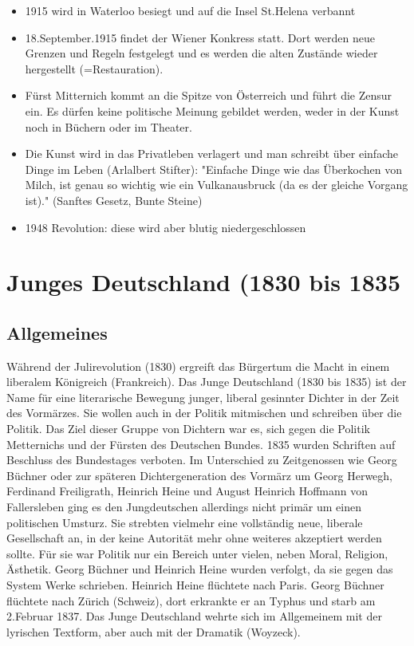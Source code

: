 \documentclass[12pt,a4paper]{article}
\begin{document}
	\begin{itemize}
	\item 1915 wird in Waterloo besiegt und auf die Insel St.Helena verbannt
	\item 18.September.1915 findet der Wiener Konkress statt. Dort werden neue Grenzen und Regeln festgelegt und es werden die alten Zustände
	wieder hergestellt (=Restauration).
	\item Fürst Mitternich kommt an die Spitze von Österreich und führt die Zensur ein. Es dürfen keine politische Meinung gebildet werden, weder in der Kunst noch in Büchern oder im Theater.
	\item Die Kunst wird in das Privatleben verlagert und man schreibt über einfache Dinge im Leben (Arlalbert Stifter): "Einfache Dinge wie das Überkochen von Milch, ist genau so wichtig wie ein Vulkanausbruck (da es der gleiche Vorgang ist)." (Sanftes Gesetz, Bunte Steine)

	\item 1948 Revolution: diese wird aber blutig niedergeschlossen	
	
	\end{itemize}
	
\newpage	
	
\section{Junges Deutschland (1830 bis 1835}

\subsection{Allgemeines}
Während der Julirevolution (1830) ergreift das Bürgertum die Macht in einem liberalem Königreich (Frankreich). Das Junge Deutschland (1830 bis 1835) ist der Name für eine literarische Bewegung junger, liberal gesinnter Dichter in der Zeit des Vormärzes. Sie wollen auch in der Politik mitmischen und schreiben über die Politik. Das Ziel dieser Gruppe von Dichtern war es, sich gegen die Politik Metternichs und der Fürsten des Deutschen Bundes. 1835 wurden Schriften auf Beschluss des Bundestages verboten.
\newline
\newline
Im Unterschied zu Zeitgenossen wie Georg Büchner oder zur späteren Dichtergeneration des Vormärz um Georg Herwegh, Ferdinand Freiligrath, Heinrich Heine und August Heinrich Hoffmann von Fallersleben ging es den Jungdeutschen allerdings nicht primär um einen politischen Umsturz. Sie strebten vielmehr eine vollständig neue, liberale Gesellschaft an, in der keine Autorität mehr ohne weiteres akzeptiert werden sollte. Für sie war Politik nur ein Bereich unter vielen, neben Moral, Religion, Ästhetik.
\newline
\newline
Georg Büchner und Heinrich Heine wurden verfolgt, da sie gegen das System Werke schrieben. Heinrich Heine flüchtete nach Paris. Georg Büchner flüchtete nach Zürich (Schweiz), dort erkrankte er an Typhus und starb am 2.Februar 1837.
\newline
\newline
Das Junge Deutschland wehrte sich im Allgemeinem mit der lyrischen Textform, aber auch mit der Dramatik (Woyzeck).
\end{document}
